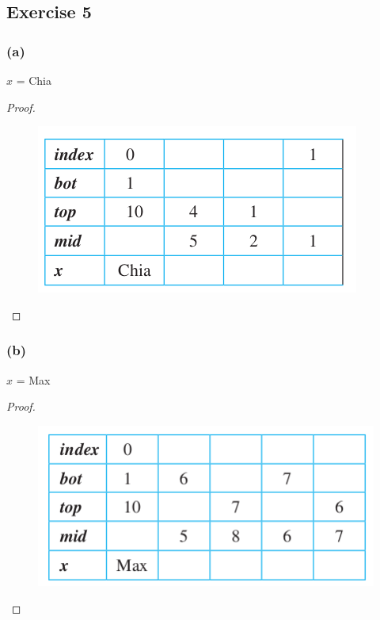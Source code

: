 \documentclass[14pt]{extarticle}
\begin{document}
\subsection{Exercise 5}
\subsubsection{(a)}
\(x\) = Chia
\begin{proof}
\begin{figure}[ht!]
\centering
\includegraphics[scale=0.5]{../images/11.5.5.a.png}
\end{figure}
\end{proof}

\subsubsection{(b)}
\(x\) = Max
\begin{proof}
\begin{figure}[ht!]
\centering
\includegraphics[scale=0.5]{../images/11.5.5.b.png}
\end{figure}
\end{proof}
\end{document}

